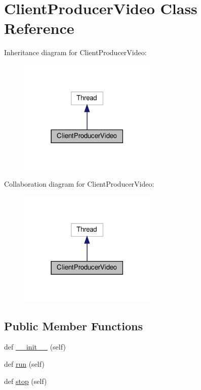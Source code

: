 \hypertarget{class_client_1_1_client_producer_video}{}\section{Client\+Producer\+Video Class Reference}
\label{class_client_1_1_client_producer_video}


Inheritance diagram for Client\+Producer\+Video\+:
\nopagebreak
\begin{figure}[H]
\begin{center}
\leavevmode
\includegraphics[width=186pt]{class_client_1_1_client_producer_video__inherit__graph}
\end{center}
\end{figure}


Collaboration diagram for Client\+Producer\+Video\+:
\nopagebreak
\begin{figure}[H]
\begin{center}
\leavevmode
\includegraphics[width=186pt]{class_client_1_1_client_producer_video__coll__graph}
\end{center}
\end{figure}
\subsection*{Public Member Functions}
\begin{DoxyCompactItemize}
\item 
def \hyperlink{class_client_1_1_client_producer_video_ae64f0875afe3067b97ba370b354b9213}{\+\_\+\+\_\+init\+\_\+\+\_\+} (self)
\item 
def \hyperlink{class_client_1_1_client_producer_video_ad22709b2e67308af35f55680d5a026e0}{run} (self)
\item 
def \hyperlink{class_client_1_1_client_producer_video_a26ca7c1c7fcdd35378e7be97727047a6}{stop} (self)
\end{DoxyCompactItemize}



